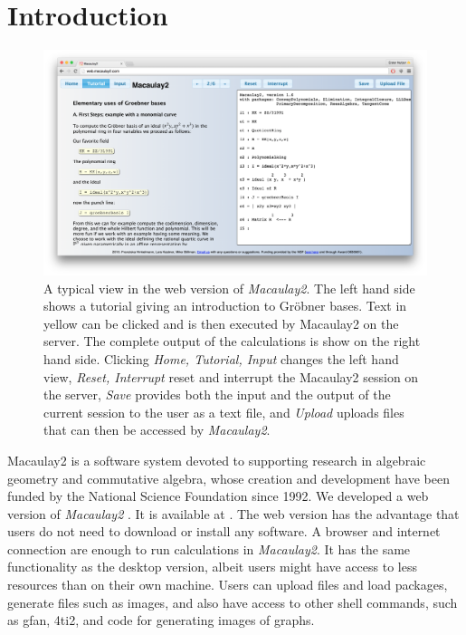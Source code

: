 \documentclass[twocolumn]{article}
\def\M2{{\it Macaulay2}}
\begin{document}
\section{Introduction}
\begin{figure}[htb]
    \includegraphics[width=.99\textwidth]{homeWebsite.jpg}
    \caption{A typical view in the web version of \M2. The left hand
        side shows a tutorial giving an introduction to Gr\"obner
        bases. Text in yellow can be clicked and is then executed by
        Macaulay2 on the server. The complete output of the calculations
        is show on the right hand side. Clicking {\it Home, Tutorial, Input}
        changes the left hand view, {\it Reset, Interrupt}
        reset and interrupt the Macaulay2 session on the server, {\it
        Save} provides both the input and the output of the current
        session to the user as a text file, and {\it Upload} uploads files
        that can then be accessed by \M2.}
\label{fig:home}
\end{figure}



Macaulay2 is a software system devoted to supporting research
in algebraic geometry and commutative algebra, whose creation and
development have been funded by the National Science Foundation
since 1992. We developed a web version of \M2 \cite{M2}. It is available at \cite{webM2}.
The web version has the advantage that users do not need to
download or install any software. A browser and internet connection are enough to
run calculations in \M2. It
has the same functionality as the desktop version,
albeit users might have access to less resources
than on their own machine. Users can upload files and
load packages, generate files such as images, and also have
access to other shell commands, such as gfan, 4ti2, and code for
generating images of graphs.
\end{document}
